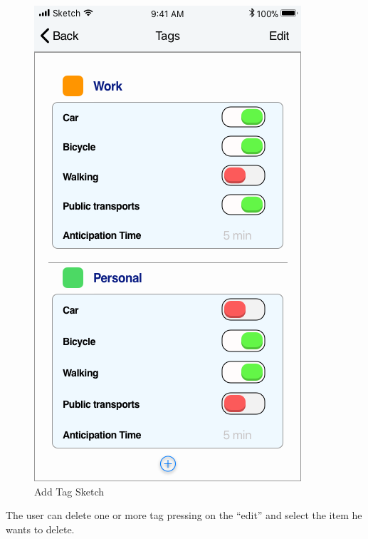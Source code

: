 \begin{figure}[H]
	\hspace{0.5cm}
	\includegraphics[scale=0.23]{Images/Interface/Tags/4_tags+work+personal}
	\caption{Add Tag Sketch}
\end{figure}
The user can delete one or more tag pressing on the “edit” and select the item he wants to delete.
